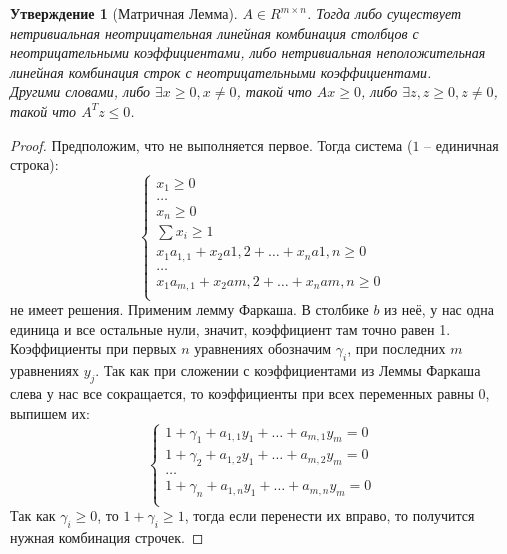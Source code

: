 \documentclass[12pt, letterpaper]{article}
\newtheorem{prop}{Утверждение}[section]
\begin{document}
\begin{prop}[Матричная Лемма]
$A \in R^{m \times n}$. Тогда либо существует нетривиальная неотрицательная линейная комбинация столбцов с неотрицательными коэффициентами, либо нетривиальная неположительная линейная комбинация строк с неотрицательными коэффициентами.\\
Другими словами, либо $\exists x \geq 0, x \neq 0$, такой что $Ax \geq 0$, либо $\exists z, z \geq 0, z \neq 0$, такой что $A^T z \leq 0$.
\end{prop}
\begin{proof}
Предположим, что не выполняется первое. Тогда система ($1$ -- единичная строка):
$$
\begin{cases}
x_1 \geq 0 \\
\ldots \\
x_n \geq 0 \\
\sum x_i \geq 1 \\
x_1 a_{1,1} + x_2 a{1, 2} + \ldots + x_n a{1, n} \geq 0 \\
\ldots \\
x_1 a_{m,1} + x_2 a{m,2} + \ldots + x_n a{m, n} \geq 0 \\
\end{cases}
$$
не имеет решения. Применим лемму Фаркаша. В столбике $b$ из неё, у нас одна единица и все остальные нули, значит, коэффициент там точно равен 1. Коэффициенты при первых $n$ уравнениях обозначим $\gamma_i$, при последних $m$ уравнениях $y_j$. Так как при сложении с коэффициентами из Леммы Фаркаша слева у нас все сокращается, то коэффициенты при всех переменных равны 0, выпишем их:
$$
\begin{cases}
1+\gamma_1 + a_{1,1} y_1 + \ldots + a_{m,1} y_m = 0 \\
1+\gamma_2 + a_{1,2} y_1 + \ldots + a_{m, 2} y_m = 0 \\
\ldots \\
1 +\gamma_n + a_{1,n} y_1 + \ldots + a_{m,n} y_m = 0\\
\end{cases}
$$
Так как $\gamma_i \geq 0$, то $1+\gamma_i \geq 1$, тогда если перенести их вправо, то получится нужная комбинация строчек.
\end{proof}
\end{document}
